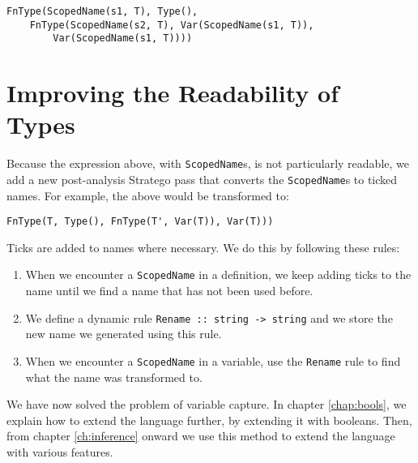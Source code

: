 \begin{lstlisting}
FnType(ScopedName(s1, T), Type(),
	FnType(ScopedName(s2, T), Var(ScopedName(s1, T)), 
		Var(ScopedName(s1, T))))
\end{lstlisting}

\section{Improving the Readability of Types}

Because the expression above, with \verb|ScopedName|s, is not particularly readable, we add a new post-analysis Stratego pass that converts the \verb|ScopedName|s to ticked names. For example, the above would be transformed to:

\begin{lstlisting}
FnType(T, Type(), FnType(T', Var(T)), Var(T)))
\end{lstlisting}
Ticks are added to names where necessary. We do this by following these rules:

\begin{enumerate}
	\item When we encounter a \verb|ScopedName| in a definition, we keep adding ticks to the name until we find a name that has not been used before. 
	\item We define a dynamic rule \verb|Rename :: string -> string| and we store the new name we generated using this rule.
	\item When we encounter a \verb|ScopedName| in a variable, use the \verb|Rename| rule to find what the name was transformed to.
\end{enumerate}

We have now solved the problem of variable capture. In chapter \ref{chap:bools}, we explain how to extend the language further, by extending it with booleans. Then, from chapter \ref{ch:inference} onward we use this method to extend the language with various features.
